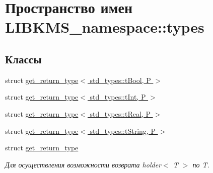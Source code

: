 \hypertarget{namespaceLIBKMS__namespace_1_1types}{\section{Пространство имен L\-I\-B\-K\-M\-S\-\_\-namespace\-:\-:types}
\label{namespaceLIBKMS__namespace_1_1types}
}
\subsection*{Классы}
\begin{DoxyCompactItemize}
\item 
struct \hyperlink{structLIBKMS__namespace_1_1types_1_1get__return__type_3_01std__types_1_1tBool_00_01P_01_4}{get\-\_\-return\-\_\-type$<$ std\-\_\-types\-::t\-Bool, P $>$}
\item 
struct \hyperlink{structLIBKMS__namespace_1_1types_1_1get__return__type_3_01std__types_1_1tInt_00_01P_01_4}{get\-\_\-return\-\_\-type$<$ std\-\_\-types\-::t\-Int, P $>$}
\item 
struct \hyperlink{structLIBKMS__namespace_1_1types_1_1get__return__type_3_01std__types_1_1tReal_00_01P_01_4}{get\-\_\-return\-\_\-type$<$ std\-\_\-types\-::t\-Real, P $>$}
\item 
struct \hyperlink{structLIBKMS__namespace_1_1types_1_1get__return__type_3_01std__types_1_1tString_00_01P_01_4}{get\-\_\-return\-\_\-type$<$ std\-\_\-types\-::t\-String, P $>$}
\item 
struct \hyperlink{structLIBKMS__namespace_1_1types_1_1get__return__type}{get\-\_\-return\-\_\-type}
\begin{DoxyCompactList}\small\item\em Для осуществления возможности возврата holder$<$ T $>$ по T. \end{DoxyCompactList}\end{DoxyCompactItemize}
